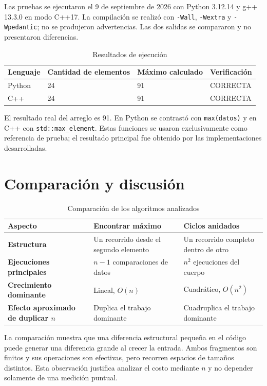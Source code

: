 \documentclass[12pt,letterpaper]{article}
\newcommand{\codigo}[1]{\texttt{#1}}
\begin{document}
Las pruebas se ejecutaron el 9 de septiembre de 2026 con Python 3.12.14 y g++ 13.3.0 en modo C++17. La compilación se realizó con \codigo{-Wall}, \codigo{-Wextra} y \codigo{-Wpedantic}; no se produjeron advertencias. Las dos salidas se compararon y no presentaron diferencias.

\begin{table}[htbp]
\centering
\caption{Resultados de ejecución}
\begin{tabularx}{\textwidth}{lXXX}
\toprule
Lenguaje & Cantidad de elementos & Máximo calculado & Verificación\\
\midrule
Python & 24 & 91 & CORRECTA\\
C++ & 24 & 91 & CORRECTA\\
\bottomrule
\end{tabularx}
\end{table}

El resultado real del arreglo es 91. En Python se contrastó con \codigo{max(datos)} y en C++ con \codigo{std::max\_element}. Estas funciones se usaron exclusivamente como referencia de prueba; el resultado principal fue obtenido por las implementaciones desarrolladas.

\section{Comparación y discusión}

\begin{table}[htbp]
\centering
\caption{Comparación de los algoritmos analizados}
\begin{tabularx}{\textwidth}{>{\bfseries}p{4.2cm}XX}
\toprule
Aspecto & Encontrar máximo & Ciclos anidados\\
\midrule
Estructura & Un recorrido desde el segundo elemento & Un recorrido completo dentro de otro\\
Ejecuciones principales & $n-1$ comparaciones de datos & $n^2$ ejecuciones del cuerpo\\
Crecimiento dominante & Lineal, $O(n)$ & Cuadrático, $O(n^2)$\\
Efecto aproximado de duplicar $n$ & Duplica el trabajo dominante & Cuadruplica el trabajo dominante\\
\bottomrule
\end{tabularx}
\end{table}

La comparación muestra que una diferencia estructural pequeña en el código puede generar una diferencia grande al crecer la entrada. Ambos fragmentos son finitos y sus operaciones son efectivas, pero recorren espacios de tamaños distintos. Esta observación justifica analizar el costo mediante $n$ y no depender solamente de una medición puntual.
\end{document}
